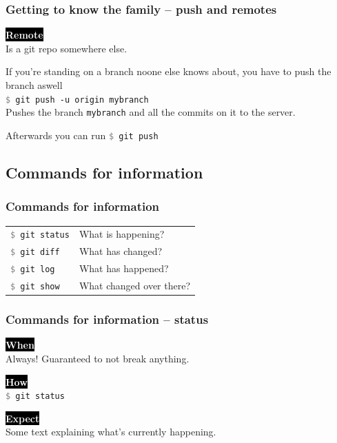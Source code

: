 \documentclass{beamer}
\newcommand{\keyword}[1]{\hspace{-1.0em}\colorbox{black}{\textcolor{white}{\textbf{#1}\vphantom{Ep}}}\vspace{0.2em}} %
\newcommand{\command}[1]{\texttt{\textcolor{gray}{\$} {#1}}}
\begin{document}
\begin{frame}[fragile]
  \frametitle{Getting to know the family -- push and remotes}
  \keyword{Remote}\\
  Is a git repo somewhere else. \\
  \vspace{1em}

  If you're standing on a branch noone else knows about, you have
  to push the branch aswell\\
  \vspace{1em}
  \command{git push -u origin mybranch} \\
  Pushes the branch \texttt{mybranch} and all the
  commits on it to the server.
  \vspace{1em}

  Afterwards you can run \command{git push}

\end{frame}

\subsection{Commands for information}

\begin{frame}[fragile]
  \frametitle{Commands for information}

  \begin{tabular}{ll}
    \command{git status} & What is happening? \\
    \command{git diff} & What has changed? \\
    \command{git log} & What has happened? \\
    \command{git show} & What changed over there? \\
  \end{tabular}

\end{frame}

\begin{frame}
  \frametitle{Commands for information -- status}

  \keyword{When}\\
  Always! Guaranteed to not break anything.
  \vspace{0.5em}

  \keyword{How}\\
  \command{git status}
  \vspace{0.5em}

  \keyword{Expect}\\
  Some text explaining what's currently happening.
\end{frame}
\end{document}
